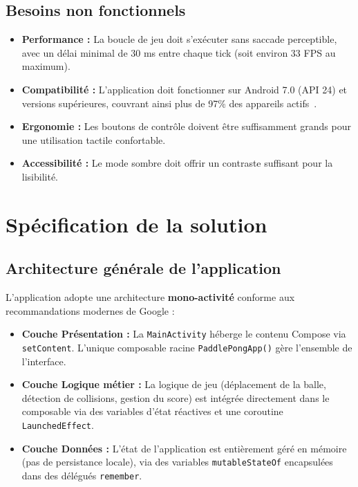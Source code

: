 \documentclass[12pt,a4paper]{report}
\begin{document}
\subsection{Besoins non fonctionnels}
\begin{itemize}
    \item \textbf{Performance :} La boucle de jeu doit s'ex\'ecuter sans saccade perceptible, avec un d\'elai minimal de 30 ms entre chaque tick (soit environ 33 FPS au maximum).
    \item \textbf{Compatibilit\'e :} L'application doit fonctionner sur Android 7.0 (API 24) et versions sup\'erieures, couvrant ainsi plus de 97\% des appareils actifs~\cite{android_distribution}.
    \item \textbf{Ergonomie :} Les boutons de contr\^ole doivent \^etre suffisamment grands pour une utilisation tactile confortable.
    \item \textbf{Accessibilit\'e :} Le mode sombre doit offrir un contraste suffisant pour la lisibilit\'e.
\end{itemize}

\section{Sp\'ecification de la solution}

\subsection{Architecture g\'en\'erale de l'application}
L'application adopte une architecture \textbf{mono-activit\'e} conforme aux recommandations modernes de Google :

\begin{itemize}
    \item \textbf{Couche Pr\'esentation :} La \texttt{MainActivity} h\'eberge le contenu Compose via \texttt{setContent}. L'unique composable racine \texttt{PaddlePongApp()} g\`ere l'ensemble de l'interface.
    \item \textbf{Couche Logique m\'etier :} La logique de jeu (d\'eplacement de la balle, d\'etection de collisions, gestion du score) est int\'egr\'ee directement dans le composable via des variables d'\'etat r\'eactives et une coroutine \texttt{LaunchedEffect}.
    \item \textbf{Couche Donn\'ees :} L'\'etat de l'application est enti\`erement g\'er\'e en m\'emoire (pas de persistance locale), via des variables \texttt{mutableStateOf} encapsul\'ees dans des d\'el\'egu\'es \texttt{remember}.
\end{itemize}
\end{document}
